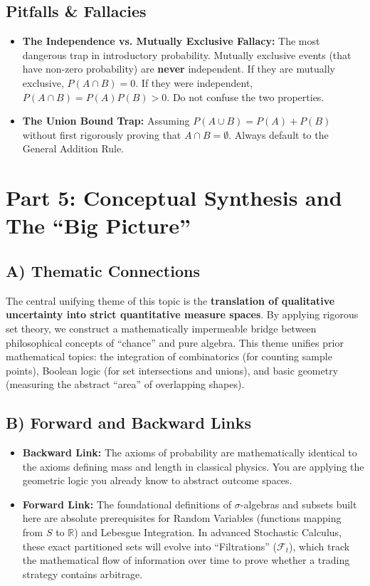 \documentclass[12pt]{article}
\begin{document}
\subsection{Pitfalls \& Fallacies}
\begin{itemize}
    \item \textbf{The Independence vs. Mutually Exclusive Fallacy:} The most dangerous trap in introductory probability. Mutually exclusive events (that have non-zero probability) are \textbf{never} independent. If they are mutually exclusive, $P(A \cap B) = 0$. If they were independent, $P(A \cap B) = P(A)P(B) > 0$. Do not confuse the two properties.
    \item \textbf{The Union Bound Trap:} Assuming $P(A \cup B) = P(A) + P(B)$ without first rigorously proving that $A \cap B = \emptyset$. Always default to the General Addition Rule.
\end{itemize}

\newpage
\section{Part 5: Conceptual Synthesis and The ``Big Picture''}

\subsection{A) Thematic Connections}
The central unifying theme of this topic is the \textbf{translation of qualitative uncertainty into strict quantitative measure spaces}. By applying rigorous set theory, we construct a mathematically impermeable bridge between philosophical concepts of ``chance'' and pure algebra. This theme unifies prior mathematical topics: the integration of combinatorics (for counting sample points), Boolean logic (for set intersections and unions), and basic geometry (measuring the abstract ``area'' of overlapping shapes).

\subsection{B) Forward and Backward Links}
\begin{itemize}
    \item \textbf{Backward Link:} The axioms of probability are mathematically identical to the axioms defining mass and length in classical physics. You are applying the geometric logic you already know to abstract outcome spaces. 
    \item \textbf{Forward Link:} The foundational definitions of $\sigma$-algebras and subsets built here are absolute prerequisites for Random Variables (functions mapping from $S$ to $\mathbb{R}$) and Lebesgue Integration. In advanced Stochastic Calculus, these exact partitioned sets will evolve into ``Filtrations'' ($\mathcal{F}_t$), which track the mathematical flow of information over time to prove whether a trading strategy contains arbitrage. 
\end{itemize}
\end{document}
